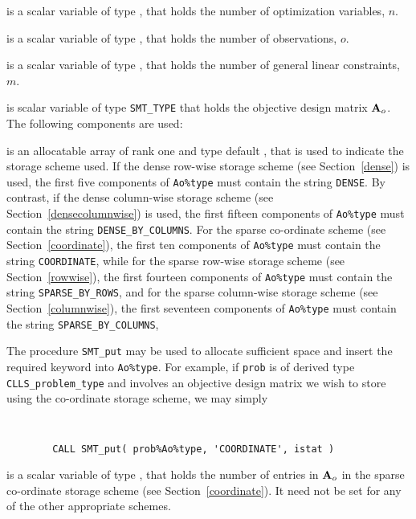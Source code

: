 \documentclass{galahad}
\newcommand{\packagename}{CLLS}
\begin{document}
\begin{description}

 is a scalar variable of type \integer,
 that holds the number of optimization variables, $n$.

 is a scalar variable of type \integer,
 that holds the number of observations, $o$.

 is a scalar variable of type \integer,
 that holds the number of general linear constraints, $m$.

 is scalar variable of type {\tt SMT\_TYPE}
that holds the objective design matrix ${\mathbf{A}}_o$.
The following components are used:

\begin{description}

 is an allocatable array of rank one and type default \character,
that is used to indicate the storage scheme used.
If the dense row-wise storage scheme (see Section~\ref{dense}) is used,
the first five components of {\tt Ao\%type} must contain the
string {\tt DENSE}.
By contrast, if the dense column-wise storage scheme
(see Section~\ref{densecolumnwise}) is used,
the first fifteen components of {\tt Ao\%type} must contain the
string {\tt DENSE\_BY\_COLUMNS}.
For the sparse co-ordinate scheme (see Section~\ref{coordinate}),
the first ten components of {\tt Ao\%type} must contain the
string {\tt COORDINATE}, while
for the sparse row-wise storage scheme (see Section~\ref{rowwise}),
the first fourteen components of {\tt Ao\%type} must contain the
string {\tt SPARSE\_BY\_ROWS},
and for the sparse column-wise storage scheme (see Section~\ref{columnwise}),
the first seventeen components of {\tt Ao\%type} must contain the
string {\tt SPARSE\_BY\_COLUMNS},

The procedure {\tt SMT\_put} may be used to allocate sufficient space and
insert the required keyword into {\tt Ao\%type}. For example,
if {\tt prob} is of derived type {\tt \packagename\_problem\_type}
and involves an objective design matrix we wish to store using the co-ordinate
storage scheme, we may simply
{\tt
\begin{verbatim}
        CALL SMT_put( prob%Ao%type, 'COORDINATE', istat )
\end{verbatim}
}
\noindent

 is a scalar variable of type \integer, that
holds the number of entries in ${\mathbf{A}}_o$
in the sparse co-ordinate storage scheme (see Section~\ref{coordinate}).
It need not be set for any of the other appropriate schemes.


\end{description}
\end{description}
\end{document}
